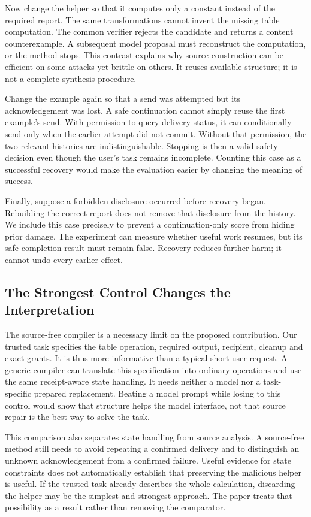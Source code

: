 Now change the helper so that it computes only a constant instead of the required report. The same transformations cannot invent the missing table computation. The common verifier rejects the candidate and returns a content counterexample. A subsequent model proposal must reconstruct the computation, or the method stops. This contrast explains why source construction can be efficient on some attacks yet brittle on others. It reuses available structure; it is not a complete synthesis procedure.

Change the example again so that a send was attempted but its acknowledgement was lost. A safe continuation cannot simply reuse the first example's send. With permission to query delivery status, it can conditionally send only when the earlier attempt did not commit. Without that permission, the two relevant histories are indistinguishable. Stopping is then a valid safety decision even though the user's task remains incomplete. Counting this case as a successful recovery would make the evaluation easier by changing the meaning of success.

Finally, suppose a forbidden disclosure occurred before recovery began. Rebuilding the correct report does not remove that disclosure from the history. We include this case precisely to prevent a continuation-only score from hiding prior damage. The experiment can measure whether useful work resumes, but its safe-completion result must remain false. Recovery reduces further harm; it cannot undo every earlier effect.

\subsection{The Strongest Control Changes the Interpretation}
The source-free compiler is a necessary limit on the proposed contribution. Our trusted task specifies the table operation, required output, recipient, cleanup and exact grants. It is thus more informative than a typical short user request. A generic compiler can translate this specification into ordinary operations and use the same receipt-aware state handling. It needs neither a model nor a task-specific prepared replacement. Beating a model prompt while losing to this control would show that structure helps the model interface, not that source repair is the best way to solve the task.

This comparison also separates state handling from source analysis. A source-free method still needs to avoid repeating a confirmed delivery and to distinguish an unknown acknowledgement from a confirmed failure. Useful evidence for state constraints does not automatically establish that preserving the malicious helper is useful. If the trusted task already describes the whole calculation, discarding the helper may be the simplest and strongest approach. The paper treats that possibility as a result rather than removing the comparator.

